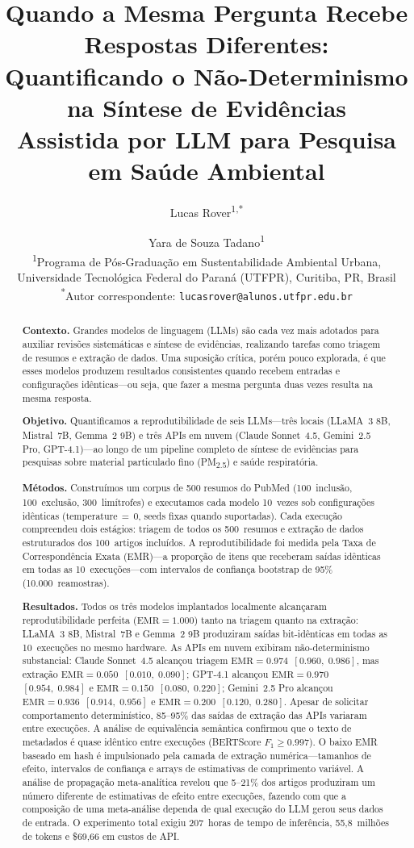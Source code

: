 \documentclass[12pt, a4paper]{article}
\title{%
  \textbf{Quando a Mesma Pergunta Recebe Respostas Diferentes:}\\[6pt]
  \large Quantificando o Não-Determinismo na Síntese de Evidências\\
  Assistida por LLM para Pesquisa em Saúde Ambiental%
}
\author{
  Lucas Rover\textsuperscript{1,*} \and
  Yara de Souza Tadano\textsuperscript{1}\\[6pt]
  \small\textsuperscript{1}Programa de Pós-Graduação em Sustentabilidade Ambiental Urbana,\\
  \small Universidade Tecnológica Federal do Paraná (UTFPR), Curitiba, PR, Brasil\\[4pt]
  \small\textsuperscript{*}Autor correspondente: \texttt{lucasrover@alunos.utfpr.edu.br}
}
\date{}
\newcommand{\emr}{\textrm{EMR}}
\newcommand{\ci}[2]{[#1,\;#2]}
\begin{document}
\maketitle

\begin{abstract}
\noindent\textbf{Contexto.}
Grandes modelos de linguagem (LLMs) são cada vez mais adotados para auxiliar revisões sistemáticas e síntese de evidências, realizando tarefas como triagem de resumos e extração de dados.
Uma suposição crítica, porém pouco explorada, é que esses modelos produzem resultados consistentes quando recebem entradas e configurações idênticas---ou seja, que fazer a mesma pergunta duas vezes resulta na mesma resposta.

\noindent\textbf{Objetivo.}
Quantificamos a reprodutibilidade de seis LLMs---três locais (LLaMA~3 8B, Mistral~7B, Gemma~2 9B) e três APIs em nuvem (Claude Sonnet~4.5, Gemini~2.5 Pro, GPT-4.1)---ao longo de um pipeline completo de síntese de evidências para pesquisas sobre material particulado fino (PM\textsubscript{2.5}) e saúde respiratória.

\noindent\textbf{Métodos.}
Construímos um corpus de 500 resumos do PubMed (100~inclusão, 100~exclusão, 300~limítrofes) e executamos cada modelo 10~vezes sob configurações idênticas (temperature$\,{=}\,$0, seeds fixas quando suportadas).
Cada execução compreendeu dois estágios: triagem de todos os 500~resumos e extração de dados estruturados dos 100~artigos incluídos.
A reprodutibilidade foi medida pela Taxa de Correspondência Exata (EMR)---a proporção de itens que receberam saídas idênticas em todas as 10~execuções---com intervalos de confiança bootstrap de 95\% (10.000~reamostras).

\noindent\textbf{Resultados.}
Todos os três modelos implantados localmente alcançaram reprodutibilidade perfeita ($\emr{=}1.000$) tanto na triagem quanto na extração: LLaMA~3 8B, Mistral~7B e Gemma~2 9B produziram saídas bit-idênticas em todas as 10~execuções no mesmo hardware.
As APIs em nuvem exibiram não-determinismo substancial: Claude Sonnet~4.5 alcançou triagem $\emr{=}0.974$~$\ci{0.960}{0.986}$, mas extração $\emr{=}0.050$~$\ci{0.010}{0.090}$; GPT-4.1 alcançou $\emr{=}0.970$~$\ci{0.954}{0.984}$ e $\emr{=}0.150$~$\ci{0.080}{0.220}$; Gemini~2.5 Pro alcançou $\emr{=}0.936$~$\ci{0.914}{0.956}$ e $\emr{=}0.200$~$\ci{0.120}{0.280}$.
Apesar de solicitar comportamento determinístico, 85--95\% das saídas de extração das APIs variaram entre execuções.
A análise de equivalência semântica confirmou que o texto de metadados é quase idêntico entre execuções (BERTScore $F_1{\geq}0.997$).
O baixo EMR baseado em hash é impulsionado pela camada de extração numérica---tamanhos de efeito, intervalos de confiança e arrays de estimativas de comprimento variável.
A análise de propagação meta-analítica revelou que 5--21\% dos artigos produziram um número diferente de estimativas de efeito entre execuções, fazendo com que a composição de uma meta-análise dependa de qual execução do LLM gerou seus dados de entrada.
O experimento total exigiu 207~horas de tempo de inferência, 55,8~milhões de tokens e \$69,66 em custos de API.


\end{abstract}
\end{document}
